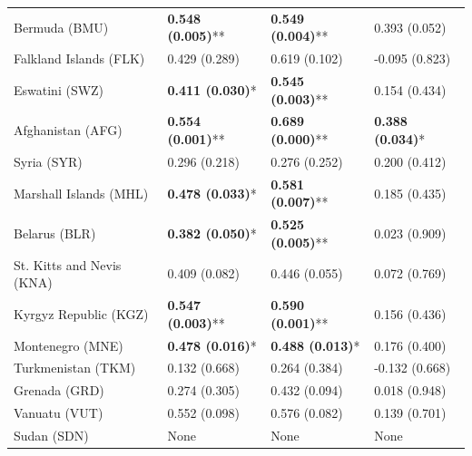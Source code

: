 \begin{longtable}{p{5cm}p{3cm}p{3cm}p{5cm}}
Bermuda (BMU) & \textcolor{atlLime600}{\textbf{0.548 (0.005)}**} & \textcolor{atlLime600}{\textbf{0.549 (0.004)}**} & \textcolor{atlOrange600}{0.393 (0.052)} \\
Falkland Islands (FLK) & \textcolor{atlOrange600}{0.429 (0.289)} & \textcolor{atlOrange600}{0.619 (0.102)} & \textcolor{atlOrange600}{-0.095 (0.823)} \\
Eswatini (SWZ) & \textcolor{atlLime600}{\textbf{0.411 (0.030)}*} & \textcolor{atlLime600}{\textbf{0.545 (0.003)}**} & \textcolor{atlOrange600}{0.154 (0.434)} \\
Afghanistan (AFG) & \textcolor{atlLime600}{\textbf{0.554 (0.001)}**} & \textcolor{atlLime600}{\textbf{0.689 (0.000)}**} & \textcolor{atlLime600}{\textbf{0.388 (0.034)}*} \\
Syria (SYR) & \textcolor{atlOrange600}{0.296 (0.218)} & \textcolor{atlOrange600}{0.276 (0.252)} & \textcolor{atlOrange600}{0.200 (0.412)} \\
Marshall Islands (MHL) & \textcolor{atlLime600}{\textbf{0.478 (0.033)}*} & \textcolor{atlLime600}{\textbf{0.581 (0.007)}**} & \textcolor{atlOrange600}{0.185 (0.435)} \\
Belarus (BLR) & \textcolor{atlLime600}{\textbf{0.382 (0.050)}*} & \textcolor{atlLime600}{\textbf{0.525 (0.005)}**} & \textcolor{atlOrange600}{0.023 (0.909)} \\
St. Kitts and Nevis (KNA) & \textcolor{atlOrange600}{0.409 (0.082)} & \textcolor{atlOrange600}{0.446 (0.055)} & \textcolor{atlOrange600}{0.072 (0.769)} \\
Kyrgyz Republic (KGZ) & \textcolor{atlLime600}{\textbf{0.547 (0.003)}**} & \textcolor{atlLime600}{\textbf{0.590 (0.001)}**} & \textcolor{atlOrange600}{0.156 (0.436)} \\
Montenegro (MNE) & \textcolor{atlLime600}{\textbf{0.478 (0.016)}*} & \textcolor{atlLime600}{\textbf{0.488 (0.013)}*} & \textcolor{atlOrange600}{0.176 (0.400)} \\
Turkmenistan (TKM) & \textcolor{atlOrange600}{0.132 (0.668)} & \textcolor{atlOrange600}{0.264 (0.384)} & \textcolor{atlOrange600}{-0.132 (0.668)} \\
Grenada (GRD) & \textcolor{atlOrange600}{0.274 (0.305)} & \textcolor{atlOrange600}{0.432 (0.094)} & \textcolor{atlOrange600}{0.018 (0.948)} \\
Vanuatu (VUT) & \textcolor{atlOrange600}{0.552 (0.098)} & \textcolor{atlOrange600}{0.576 (0.082)} & \textcolor{atlOrange600}{0.139 (0.701)} \\
Sudan (SDN) & None & None & None \\

\end{longtable}
